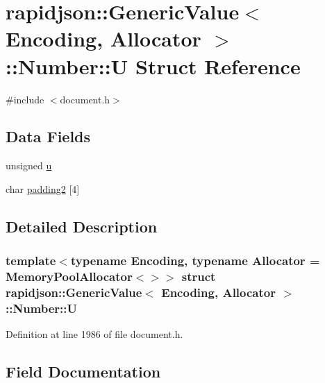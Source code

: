 \hypertarget{structrapidjson_1_1_generic_value_1_1_number_1_1_u}{}\section{rapidjson\+::Generic\+Value$<$ Encoding, Allocator $>$\+::Number\+::U Struct Reference}
\label{structrapidjson_1_1_generic_value_1_1_number_1_1_u}


{\ttfamily \#include $<$document.\+h$>$}

\subsection*{Data Fields}
\begin{DoxyCompactItemize}
\item 
unsigned \mbox{\hyperlink{structrapidjson_1_1_generic_value_1_1_number_1_1_u_aa624c2fe538411dd515dcfb0d72472b1}{u}}
\item 
char \mbox{\hyperlink{structrapidjson_1_1_generic_value_1_1_number_1_1_u_a5e882e180f56ea6cc4fd1e1d508e5a63}{padding2}} \mbox{[}4\mbox{]}
\end{DoxyCompactItemize}


\subsection{Detailed Description}
\subsubsection*{template$<$typename Encoding, typename Allocator = Memory\+Pool\+Allocator$<$$>$$>$\newline
struct rapidjson\+::\+Generic\+Value$<$ Encoding, Allocator $>$\+::\+Number\+::U}



Definition at line 1986 of file document.\+h.



\subsection{Field Documentation}
\mbox{\label{structrapidjson_1_1_generic_value_1_1_number_1_1_u_a5e882e180f56ea6cc4fd1e1d508e5a63}} 

